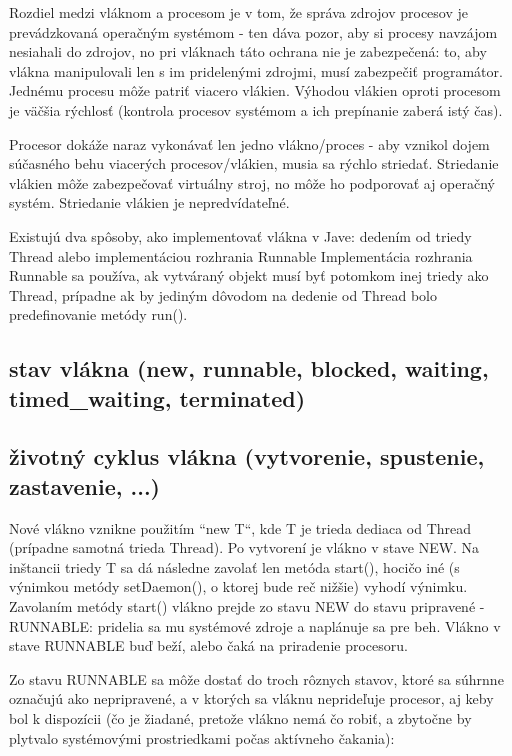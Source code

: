 Rozdiel medzi vláknom a procesom je v tom, že správa zdrojov procesov je prevádzkovaná operačným systémom - ten dáva pozor, aby si procesy navzájom nesiahali do zdrojov, no pri vláknach táto ochrana nie je zabezpečená: to, aby vlákna manipulovali len s im pridelenými zdrojmi, musí zabezpečiť programátor. Jednému procesu môže patriť viacero vlákien. Výhodou vlákien oproti procesom je väčšia rýchlosť (kontrola procesov systémom a ich prepínanie zaberá istý čas).

Procesor dokáže naraz vykonávať len jedno vlákno/proces - aby vznikol dojem súčasného behu viacerých procesov/vlákien, musia sa rýchlo striedať. Striedanie vlákien môže zabezpečovať virtuálny stroj, no môže ho podporovať aj operačný systém. Striedanie vlákien je nepredvídateľné.


Existujú dva spôsoby, ako implementovať vlákna v Jave: dedením od triedy Thread alebo implementáciou rozhrania Runnable
Implementácia rozhrania Runnable sa používa, ak vytváraný objekt musí byť potomkom inej triedy ako Thread, prípadne ak by jediným dôvodom na dedenie od Thread bolo predefinovanie metódy run().



	\subsection{stav vlákna (new, runnable, blocked, waiting, timed\_waiting, terminated)}



	\subsection{životný cyklus vlákna (vytvorenie, spustenie, zastavenie, ...)}

		Nové vlákno vznikne použitím “new T“, kde T je trieda dediaca od Thread (prípadne samotná trieda Thread). Po vytvorení je vlákno v stave NEW. Na inštancii triedy T sa dá následne zavolať len metóda start(), hocičo iné (s výnimkou metódy setDaemon(), o ktorej bude reč nižšie) vyhodí výnimku. Zavolaním metódy start() vlákno prejde zo stavu NEW do stavu pripravené - RUNNABLE: pridelia sa mu systémové zdroje a naplánuje sa pre beh. Vlákno v stave RUNNABLE buď beží, alebo čaká na priradenie procesoru.

		Zo stavu RUNNABLE sa môže dostať do troch rôznych stavov, ktoré sa súhrnne označujú ako nepripravené, a v ktorých sa vláknu neprideľuje procesor, aj keby bol k dispozícii (čo je žiadané, pretože vlákno nemá čo robiť, a zbytočne by plytvalo systémovými prostriedkami počas aktívneho čakania):


